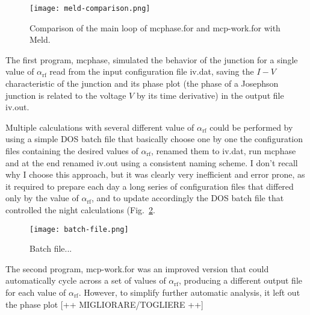 \begin{figure}[bt]
	\centering
	\texttt{[image: meld-comparison.png]}
	\caption{Comparison of the main loop of \textsf{mcphase.for} and \textsf{mcp-work.for} with Meld.}
	\label{fig:meld-comparison}
\end{figure}


The first program, \textsf{mcphase}, simulated the behavior of the junction for a single value of $\alpha_\mathrm{rf}$ read from the input configuration file \textsf{iv.dat}, saving the $I - V$ characteristic of the junction and its phase plot (the phase of a Josephson junction is related to the voltage $V$ by its time derivative) in the output file \textsf{iv.out}.

Multiple calculations with several different value of $\alpha_\mathrm{rf}$ could be performed by using a simple DOS batch file that basically choose one by one the configuration files containing the desired values of $\alpha_\mathrm{rf}$, renamed them to \textsf{iv.dat}, run \textsf{mcphase} and at the end renamed \textsf{iv.out} using a consistent naming scheme.
I don't recall why I choose this approach, but it was clearly very inefficient and error prone, as it required to prepare each day a long series of configuration files that differed only by the value of $\alpha_\mathrm{rf}$, and to update accordingly the DOS batch file that controlled the night calculations (Fig.~\ref{fig:batch-file}.

\begin{figure}[tbh]
	\centering
	\texttt{[image: batch-file.png]}
	\caption{Batch file...}
	\label{fig:batch-file}
\end{figure}


The second program, \textsf{mcp-work.for} was an improved version that could automatically cycle across a  set of values of $\alpha_\mathrm{rf}$, producing a different output file for each value of $\alpha_\mathrm{rf}$. However, to simplify further automatic analysis, it left out the phase plot [++ MIGLIORARE/TOGLIERE ++]

